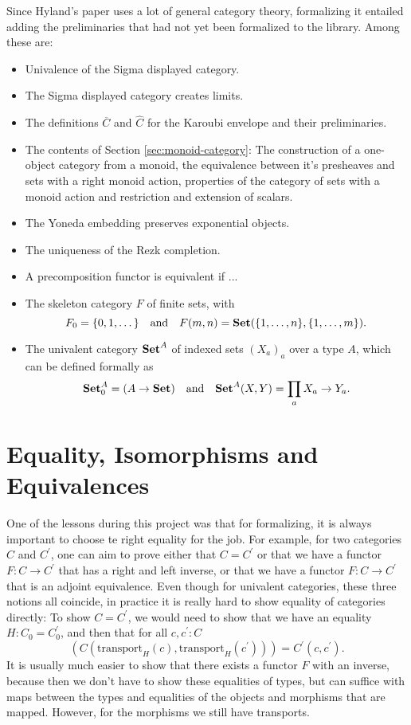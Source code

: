 Since Hyland's paper uses a lot of general category theory, formalizing it entailed adding the preliminaries that had not yet been formalized to the library. Among these are:
\begin{itemize}
  \item Univalence of the Sigma displayed category.
  \item The Sigma displayed category creates limits.
  \item The definitions $ \overline C $ and $ \hat C $ for the Karoubi envelope and their preliminaries.
  \item The contents of Section \ref{sec:monoid-category}: The construction of a one-object category from a monoid, the equivalence between it's presheaves and sets with a right monoid action, properties of the category of sets with a monoid action and restriction and extension of scalars.
  \item The Yoneda embedding preserves exponential objects.
  \item The uniqueness of the Rezk completion.
  \item A precomposition functor is equivalent if ...
  \item The skeleton category $ F $ of finite sets, with
  \[ F_0 = \{ 0, 1, \dots \} \quad \text{and} \quad F(m, n) = \mathbf{Set}(\{ 1, \dots, n \}, \{ 1, \dots, m \}). \]
  \item The univalent category $ \mathbf{Set}^A $ of indexed sets $ (X_a)_a $ over a type $ A $, which can be defined formally as
  \[ \mathbf{Set}^A_0 = (A \to \mathbf{Set}) \quad \text{and} \quad \mathbf{Set}^A(X, Y) = \prod_a X_a \to Y_a. \]
\end{itemize}

\section{Equality, Isomorphisms and Equivalences}
One of the lessons during this project was that for formalizing, it is always important to choose te right equality for the job. For example, for two categories $ C $ and $ C^\prime $, one can aim to prove either that $ C = C^\prime $ or that we have a functor $ F : C \to C^\prime $ that has a right and left inverse, or that we have a functor $ F : C \to C^\prime $ that is an adjoint equivalence. Even though for univalent categories, these three notions all coincide, in practice it is really hard to show equality of categories directly: To show $ C = C^\prime $, we would need to show that we have an equality $ H : C_0 = C_0^\prime $, and then that for all $ c, c^\prime : C $
\[ (C(\mathrm{transport}_H(c), \mathrm{transport}_H(c^\prime))) = C^\prime(c, c^\prime). \]
It is usually much easier to show that there exists a functor $ F $ with an inverse, because then we don't have to show these equalities of types, but can suffice with maps between the types and equalities of the objects and morphisms that are mapped. However, for the morphisms we still have transports.

